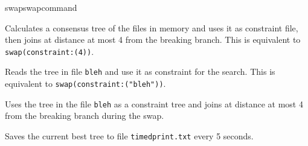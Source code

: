 \begin{command}{swap}{swapcommand}
\begin{poyexamples}
            {Calculates a consensus tree of the files in memory and uses it as
            constraint file, then joins at distance at most 4 from the breaking
            branch. This is equivalent to \texttt{swap(constraint:(4))}.}
	
            {Reads the tree in file \texttt{bleh} and use it as constraint for the
            search. This is equivalent to \texttt{swap(constraint:("bleh"))}.}	
		
            {Uses the tree in the file \texttt{bleh} as a constraint tree and joins at
            distance at most 4 from the breaking branch during the swap.}
        
            {Saves the current best tree to file \texttt{timedprint.txt} every 5 seconds.}
            
	\end{poyexamples}

	\begin{poyalso}
	\end{poyalso} 

\end{command}

